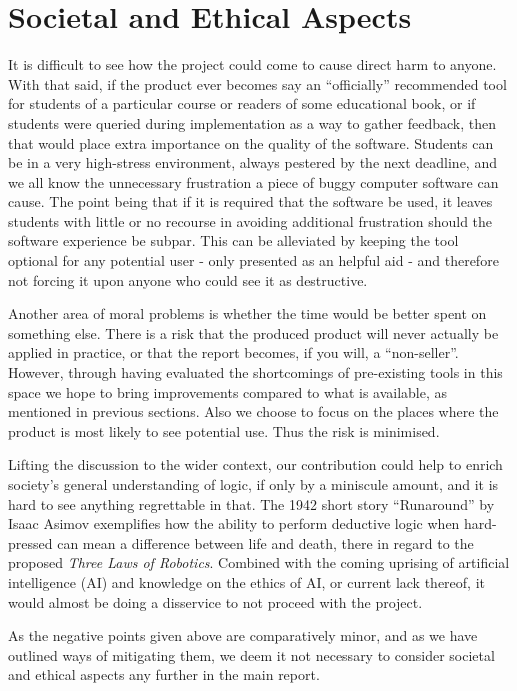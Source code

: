 
\section{Societal and Ethical Aspects}

It is difficult to see how the project could come to cause direct harm to anyone.
With that said,
if the product ever becomes say an ``officially'' recommended tool
for students of a particular course or readers of some educational book,
or if students were queried during implementation as a way to gather feedback,
then that would place extra importance on the quality of the software.
Students can be in a very high-stress environment,
always pestered by the next deadline,
and we all know the unnecessary frustration
a piece of buggy computer software can cause.
The point being that if it is required that the software be used,
it leaves students with little or no recourse in avoiding additional frustration
should the software experience be subpar.
This can be alleviated by keeping the tool optional for any potential user -
only presented as an helpful aid -
and therefore not forcing it upon anyone who could see it as destructive.

Another area of moral problems is whether the time
would be better spent on something else.
There is a risk that the produced product
will never actually be applied in practice,
or that the report becomes, if you will, a ``non-seller''.
However,
through having evaluated the shortcomings of pre-existing tools in this space
we hope to bring improvements compared to what is available,
as mentioned in previous sections.
Also we choose to focus on the places where
the product is most likely to see potential use.
Thus the risk is minimised.

Lifting the discussion to the wider context,
our contribution could help to enrich society's general understanding of logic,
if only by a miniscule amount,
and it is hard to see anything regrettable in that.
The 1942 short story ``Runaround'' by Isaac Asimov \autocite{asimov50}
exemplifies how the ability to perform deductive logic when hard-pressed
can mean a difference between life and death,
there in regard to the proposed \emph{Three Laws of Robotics}.
Combined with the coming uprising of artificial intelligence (AI)
and knowledge on the ethics of AI, or current lack thereof,
it would almost be doing a disservice to not proceed with the project.

As the negative points given above are comparatively minor,
and as we have outlined ways of mitigating them,
we deem it not necessary to
consider societal and ethical aspects any further in the main report.
